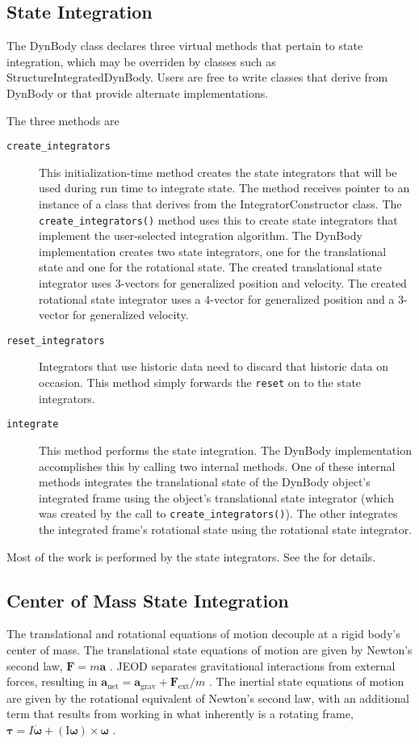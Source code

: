 \subsection{State Integration}\label{sec:detailed_state_integ}
The DynBody class declares three virtual methods that pertain to state
integration, which may be overriden by classes such as StructureIntegratedDynBody.
 Users are free to write classes that derive from DynBody or
 that provide alternate implementations.

The three methods are\begin{description}
\item[{\tt create\_integrators}] This initialization-time method creates the
  state integrators that will be used during run time to integrate state.
  The method receives pointer to an instance of a class that derives from the
  IntegratorConstructor class. The \verb+create_integrators()+ method uses
  this to create state integrators that implement the user-selected
  integration algorithm.
  The DynBody implementation creates two state integrators,
  one for the translational state and one for the rotational state.
  The created translational state integrator uses 3-vectors for generalized
  position and velocity. The created rotational state integrator uses
  a 4-vector for generalized position and a 3-vector for generalized velocity.
\item[{\tt reset\_integrators}] Integrators that use historic data need to
  discard that historic data on occasion. This method simply forwards the
  \verb+reset+ on to the state integrators.
\item[{\tt integrate}] This method performs the state integration. The
  DynBody implementation accomplishes this by calling two internal
  methods. One of these internal methods integrates the translational state of
  the DynBody object's integrated frame using the object's
  translational state integrator (which was created by the call to
  \verb+create_integrators()+).
  The other integrates the integrated frame's rotational state using the
  rotational state integrator.
\end{description}
Most of the work is performed by the state integrators. See the
 for details.

\subsection{Center of Mass State Integration}\label{sec:detailed_state_integ_com}
The translational and rotational equations of motion decouple at a rigid
body's center of mass. The translational state equations of motion are given by
Newton's second law, $\boldsymbol F=m \boldsymbol a$ . JEOD separates
gravitational interactions from external forces, resulting in
$\boldsymbol a_\text{net} =
\boldsymbol a_\text{grav} + \boldsymbol F_\text{ext}/m$ .
The inertial state equations of motion are given by the rotational equivalent
of Newton's second law, with an additional term that results from working in
what inherently is a rotating frame,
$\boldsymbol \tau = I \dot{\boldsymbol \omega} +
(\boldsymbol{\mathrm I}\boldsymbol{\omega}) \times \boldsymbol{\omega}$ .

